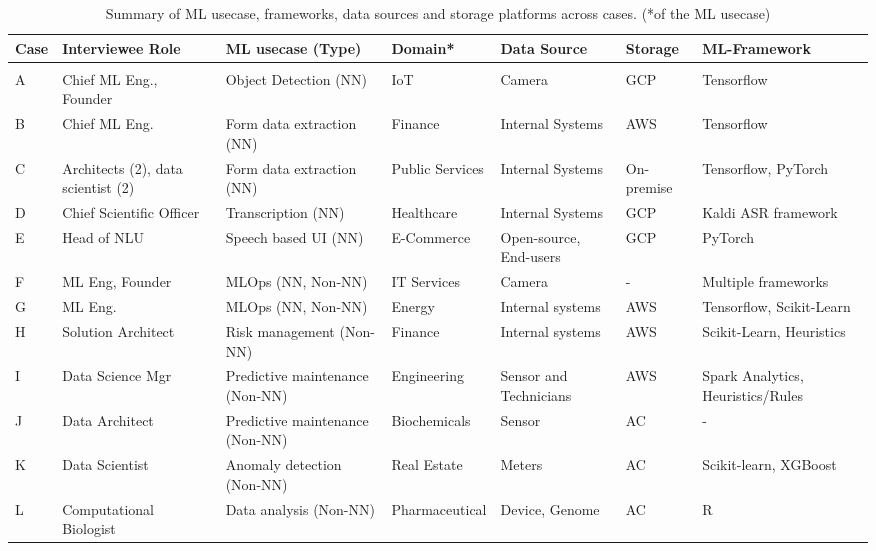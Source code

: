

\begin{table*}[t]
 \centering
  \caption{Summary of ML usecase, frameworks, data sources and storage platforms across cases. (*of the ML usecase)}
  \begin{tabular}{p{}p{}p{3cm}p{}p{2cm}p{}p{}}
    \toprule
    \textbf{Case} & \textbf{Interviewee Role} & \textbf{ML usecase (Type)} & \textbf{Domain*} &\textbf{Data Source} & \textbf{Storage} & \textbf{ML-Framework} \\
    \toprule \\
    A & Chief ML Eng., Founder & Object Detection (NN) & IoT & Camera & GCP & Tensorflow \\
    B & Chief ML Eng. & Form data extraction  (NN) & Finance & Internal Systems & AWS & Tensorflow \\
    C & Architects (2), data scientist (2) & Form data extraction (NN) & Public Services & Internal Systems & On-premise & Tensorflow, PyTorch \\
    D & Chief Scientific Officer & Transcription (NN) & Healthcare & Internal Systems & GCP & Kaldi ASR framework \\
    E & Head of NLU & Speech based UI (NN) & E-Commerce & Open-source, End-users & GCP & PyTorch \\
   F & ML Eng, Founder & MLOps (NN, Non-NN) & IT Services & Camera  & - & Multiple frameworks \\
    G & ML Eng. & MLOps (NN, Non-NN)  & Energy & Internal systems & AWS & Tensorflow, Scikit-Learn \\
    H & Solution Architect & Risk management (Non-NN) & Finance & Internal systems & AWS & Scikit-Learn, Heuristics \\
    I & Data Science Mgr & Predictive maintenance (Non-NN) & Engineering & Sensor and Technicians & AWS &  Spark Analytics, Heuristics/Rules \\
    J & Data Architect & Predictive maintenance (Non-NN) & Biochemicals & Sensor & AC & - \\
    K & Data Scientist & Anomaly detection (Non-NN) & Real Estate & Meters & AC & Scikit-learn, XGBoost \\
    L & Computational Biologist & Data analysis (Non-NN) & Pharmaceutical & Device,  Genome & AC & R \\

\end{tabular}
\end{table*}
